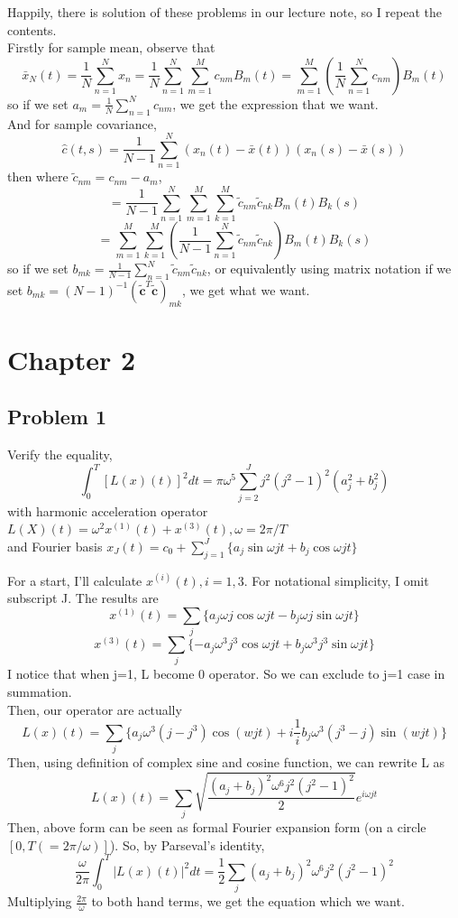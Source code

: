 \documentclass{article}
\begin{document}
Happily, there is solution of these problems in our lecture note, so I repeat the contents.\\
Firstly for sample mean, observe that
\[\bar{x}_N(t)=\frac{1}{N}\sum_{n=1}^{N}x_n=\frac{1}{N}\sum_{n=1}^{N}\sum_{m=1}^{M}c_{nm}B_m(t)=\sum_{m=1}^{M}(\frac{1}{N}\sum_{n=1}^{N}c_{nm})B_m(t)\]
so if we set \(a_m=\frac{1}{N}\sum_{n=1}^{N}c_{nm}\), we get the expression that we want.\\
And for sample covariance,
\[\hat{c}(t,s)=\frac{1}{N-1}\sum_{n=1}^{N}(x_n(t)-\bar{x}(t))(x_n(s)-\bar{x}(s))\]
then where \(\tilde{c}_{nm}=c_{nm}-a_m\),
\[=\frac{1}{N-1}\sum_{n=1}^{N}\sum_{m=1}^{M}\sum_{k=1}^{M}\tilde{c}_{nm}\tilde{{c}}_{nk}B_{m}(t)B_{k}(s)\]
\[=\sum_{m=1}^{M}\sum_{k=1}^{M}(\frac{1}{N-1}\sum_{n=1}^{N}\tilde{c}_{nm}\tilde{{c}}_{nk})B_{m}(t)B_{k}(s)\]
so if we set \(b_{mk}=\frac{1}{N-1}\sum_{n=1}^{N}\tilde{c}_{nm}\tilde{{c}}_{nk}\), 
or equivalently using matrix notation if we set \(b_{mk}=(N-1)^{-1}(\mathbf{\tilde{c}}^T\mathbf{\tilde{c}})_{mk}\), we get what we want.



\newpage
\section{Chapter 2}
\subsection{Problem 1}
Verify the equality,
\[\int_{0}^{T}[L(x)(t)]^2dt=\pi\omega^5\sum_{j=2}^{J}j^2(j^2-1)^2(a_j^2+b_j^2)\]
with harmonic acceleration operator \(L(X)(t)=\omega^2x^{(1)}(t)+x^{(3)}(t), \omega=2\pi/T\) \\
and Fourier basis \(x_{J}(t)=c_0+\sum_{j=1}^{J}\{a_j\sin{\omega jt}+b_j\cos{\omega jt}\}\)

For a start, I'll calculate $x^{(i)}(t), i=1,3$. For notational simplicity, I omit subscript J. The results are
\[x^{(1)}(t) = \sum_{j} \{a_j\omega j \cos{\omega jt} - b_j\omega j \sin{\omega jt}\}\]
\[x^{(3)}(t) = \sum_{j} \{-a_j\omega^3 j^3 \cos{\omega jt} + b_j\omega^3 j^3 \sin{\omega jt}\}\]
I notice that when j=1, L become 0 operator. So we can exclude to j=1 case in summation. \\
Then, our operator are actually
\[L(x)(t)=\sum_{j}\{a_j\omega^3(j-j^3)\cos{(wjt)} + i\frac{1}{i}b_j\omega^3(j^3-j)\sin(wjt)\}\]
Then, using definition of complex sine and cosine function, we can rewrite L as
\[L(x)(t)=\sum_{j}\sqrt{\frac{(a_j+b_j)^2\omega^6j^2(j^2-1)^2}{2}}e^{i\omega jt}\]
Then, above form can be seen as formal Fourier expansion form (on a circle $[0,T(=2\pi/\omega)]$). So, by Parseval's identity,
\[\frac{\omega}{2\pi} \int_{0}^{T}|L(x)(t)|^2dt = \frac{1}{2}\sum_{j}(a_j+b_j)^2\omega^6j^2(j^2-1)^2\]
Multiplying $\frac{2\pi}{\omega}$ to both hand terms, we get the equation which we want.
\end{document}
